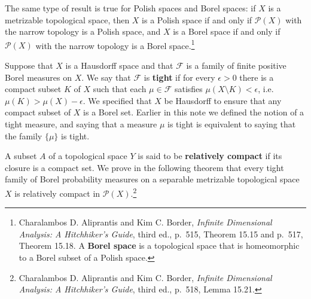 \documentclass{article}
\theoremstyle{definition}
\begin{document}
The same type of result is true for Polish spaces and Borel spaces: if $X$ is a metrizable topological
space, then $X$ is a Polish space if and only if $\mathscr{P}(X)$ with the narrow topology is  a Polish space, and $X$ is a Borel space if and only if
$\mathscr{P}(X)$ with the narrow topology is a Borel space.\footnote{Charalambos D. 
Aliprantis and Kim C. Border, {\em Infinite Dimensional Analysis: A Hitchhiker's Guide}, third ed., p.~515, Theorem 15.15 and
p.~517, Theorem 15.18. A \textbf{Borel space} is a  topological space that is homeomorphic
to a Borel subset of a Polish space.}

Suppose that $X$ is a Hausdorff  space and that
$\mathscr{F}$ is a family of finite positive Borel measures on $X$. We say that $\mathscr{F}$ is \textbf{tight} if
for every $\epsilon>0$ there is a compact subset $K$ of $X$ such that each $\mu \in \mathscr{F}$ satisfies
$\mu(X \setminus K) < \epsilon$, i.e. $\mu(K)>\mu(X)-\epsilon$. We specified that $X$ be Hausdorff to ensure that any compact subset of $X$ is a Borel set.
Earlier in this note we defined the notion of a tight measure, and saying that a measure $\mu$ is tight is equivalent to saying that the family 
$\{\mu\}$ is tight.

A subset $A$ of a topological space $Y$ is said to be \textbf{relatively compact} if its closure is a compact set. We prove
in the following theorem that
every tight family of Borel probability measures on a separable metrizable topological space $X$ is relatively compact in
$\mathscr{P}(X)$.\footnote{Charalambos D. 
Aliprantis and Kim C. Border, {\em Infinite Dimensional Analysis: A Hitchhiker's Guide}, third ed., p.~518, Lemma 15.21.}
\end{document}
